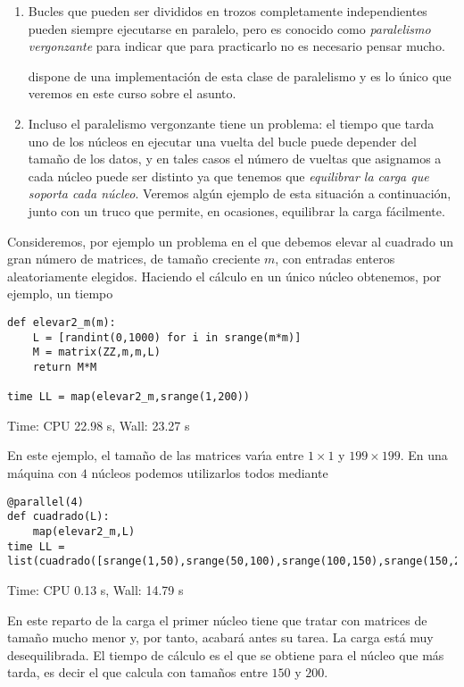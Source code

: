 \begin{enumerate}
\item Bucles que pueden ser divididos en trozos completamente independientes
pueden siempre ejecutarse en paralelo, pero es conocido como {\itshape
paralelismo vergonzante} para indicar que para practicarlo no es necesario
pensar mucho. 

{\sage} dispone de una implementaci\'on de esta clase de paralelismo y es lo
\'unico que veremos en este curso sobre el asunto.


\item Incluso el paralelismo vergonzante tiene un problema: el tiempo que tarda
uno de los n\'ucleos en ejecutar una vuelta del bucle puede depender del
tama\~no de los datos, y en tales casos el n\'umero de vueltas que asignamos a
cada n\'ucleo puede ser distinto ya que tenemos que  {\itshape equilibrar  la
carga que soporta cada
n\'ucleo}. Veremos alg\'un ejemplo de esta situaci\'on a continuaci\'on, junto
con un truco que permite, en ocasiones, equilibrar la carga f\'acilmente.
\end{enumerate}

Consideremos, por ejemplo un problema en el que debemos elevar al cuadrado un
gran n\'umero de matrices, de tama\~no creciente $m$,   con entradas enteros
aleatoriamente elegidos. Haciendo el c\'alculo en un \'unico n\'ucleo obtenemos,
por ejemplo, un tiempo
\begin{lstlisting}
def elevar2_m(m):
	L = [randint(0,1000) for i in srange(m*m)]
	M = matrix(ZZ,m,m,L)
	return M*M

time LL = map(elevar2_m,srange(1,200))
\end{lstlisting}
\begin{Output}
	Time: CPU 22.98 s, Wall: 23.27 s
\end{Output}
En este ejemplo, el tama\~no de las matrices var\'{\i}a entre $1\times 1$ y
$199\times 199.$  En una m\'aquina con $4$ n\'ucleos podemos utilizarlos todos
mediante


\begin{lstlisting}
@parallel(4)
def cuadrado(L):
	map(elevar2_m,L)
time LL =
list(cuadrado([srange(1,50),srange(50,100),srange(100,150),srange(150,200)]))
\end{lstlisting}
\begin{Output}
	Time: CPU 0.13 s, Wall: 14.79 s
\end{Output}

En este reparto de la carga el primer n\'ucleo tiene que tratar con matrices de
tama\~no mucho menor y, por tanto, acabar\'a antes su tarea. La carga est\'a muy
desequilibrada. El tiempo de c\'alculo es el que se obtiene para el n\'ucleo que
m\'as tarda, es decir el que calcula con tama\~nos entre $150$ y $200.$

